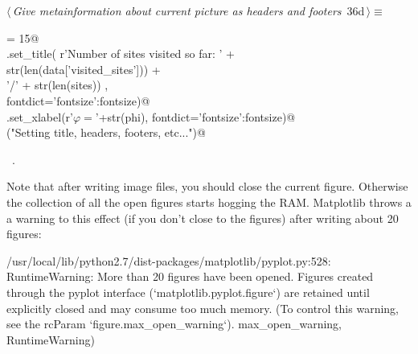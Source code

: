 \documentclass[11.5pt]{report}
\newenvironment{CVerbatim}
 {\singlespacing\center\BVerbatim}
 {\endBVerbatim\endcenter}
\begin{document}
\begin{flushleft} \small\label{scrap45}\raggedright\small
{} $\langle\,${\itshape Give metainformation about current picture as headers and footers}\nobreak\ {\footnotesize {36d}}$\,\rangle\equiv$
\vspace{-1ex}
\begin{list}{}{} \item
\mbox{}\verb@fontsize = 15@\\
\mbox{}\verb@ax.set_title( r'Number of sites visited so far: ' +\@\\
\mbox{}\verb@               str(len(data['visited_sites']))   +\@\\
\mbox{}\verb@               '/' + str(len(sites))           ,  \@\\
\mbox{}\verb@                    fontdict={'fontsize':fontsize})@\\
\mbox{}\verb@ax.set_xlabel(r'$\varphi=$'+str(phi), fontdict={'fontsize':fontsize})@\\
\mbox{}\verb@debug("Setting title, headers, footers, etc...")@\\
\mbox{}\verb@@{\NWsep}
\end{list}
\vspace{-1.5ex}
\footnotesize
\begin{list}{}{\setlength{\itemsep}{-\parsep}\setlength{\itemindent}{-\leftmargin}}
\item \NWtxtMacroRefIn\ .

\item{}
\end{list}
\vspace{4ex}
\end{flushleft}

\vspace{-0.8cm}
Note that after writing image files, you should close the current figure. Otherwise
the collection of all the open figures starts hogging the RAM. Matplotlib throws a
a warning to this effect (if you don't close to the figures) after writing about 
20 figures:

\begin{CVerbatim}[fontsize=\small]
/usr/local/lib/python2.7/dist-packages/matplotlib/pyplot.py:528: RuntimeWarning: 
More than 20 figures have been opened. Figures created through the pyplot interface 
(`matplotlib.pyplot.figure`) are retained until explicitly closed and may consume 
too much memory. (To control this warning, see the rcParam `figure.max_open_warning`).
max_open_warning, RuntimeWarning)
\end{CVerbatim}
\end{document}
